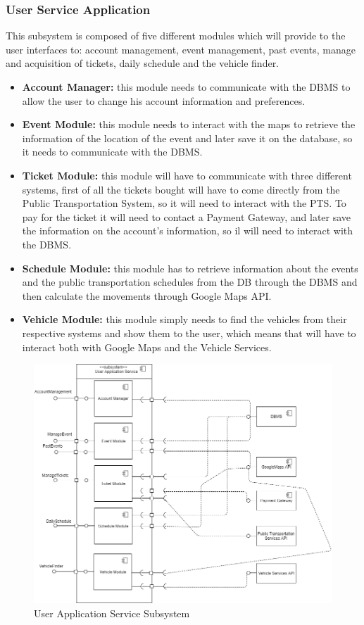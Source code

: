 \documentclass{article}
\begin{document}
			\subsubsection{User Service Application}
This subsystem is composed of five different modules which will provide to the user interfaces to: account management, event management, past events, manage and acquisition of tickets, daily schedule and the vehicle finder.
				\begin{itemize}
				\item{} \textbf{Account Manager:} this module needs to communicate with the DBMS to allow the user to change his account information and preferences.
				\item{} \textbf{Event Module:} this module needs to interact with the maps to retrieve the information of the location of the event and later save it on the database, so it needs to communicate with the DBMS.
				\item{} \textbf{Ticket Module:} this module will have to communicate with three different systems, first of all the tickets bought will have to come directly from the Public Transportation System, so it will need to interact with the PTS. To pay for the ticket it will need to contact a Payment Gateway, and later save the information on the account’s information, so il will need to interact with the DBMS.
				\item{} \textbf{Schedule Module:} this module has to retrieve information about the events and the public transportation schedules from the DB through the DBMS and then calculate the movements through Google Maps API.
				\item{} \textbf{Vehicle Module:} this module simply needs to find the vehicles from their respective systems and show them to the user, which means that will have to interact both with Google Maps and the Vehicle Services.
				\end{itemize}
				\begin{figure}[H]
				\includegraphics[width=\linewidth]{Images/Architecture/User_Application_Service.png}
				\caption{User Application Service Subsystem}
				\label{fig:UAS}
				\end{figure}
			\newpage
\end{document}
